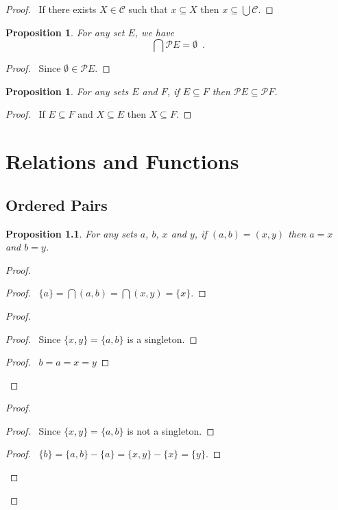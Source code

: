 \documentclass{report}
\let\qed\relax
\newtheorem{prop}[ax]{Proposition}
\theoremstyle{definition}
\begin{document}
\begin{proof}
\pf\ If there exists $X \in \mathcal{C}$ such that $x \subseteq X$ then $x \subseteq \bigcup \mathcal{C}$. \qed
\end{proof}

\begin{prop}
For any set $E$, we have
\[ \bigcap \mathcal{P} E = \emptyset \enspace . \]
\end{prop}

\begin{proof}
\pf\ Since $\emptyset \in \mathcal{P} E$. \qed
\end{proof}

\begin{prop}
For any sets $E$ and $F$, if $E \subseteq F$ then $\mathcal{P} E \subseteq \mathcal{P} F$.
\end{prop}

\begin{proof}
\pf\ If $E \subseteq F$ and $X \subseteq E$ then $X \subseteq F$. \qed
\end{proof}

\chapter{Relations and Functions}

\section{Ordered Pairs}

\begin{prop}
For any sets $a$, $b$, $x$ and $y$, if $(a,b) = (x,y)$ then $a = x$ and $b = y$.
\end{prop}

\begin{proof}
\pf
{}
\begin{proof}
	\pf\ $\{a\} = \bigcap (a,b) = \bigcap (x,y) = \{x\}$.
\end{proof}
\begin{proof}
	\begin{proof}
		\pf\ Since $\{x,y\} = \{a,b\}$ is a singleton.
	\end{proof}
	\begin{proof}
		\pf\ $b = a = x = y$
	\end{proof}
\end{proof}
\begin{proof}
	\begin{proof}
		\pf\ Since $\{x,y\} = \{a,b\}$ is not a singleton.
	\end{proof}
	\begin{proof}
		\pf\ $\{b\} = \{a,b\} - \{a\} = \{x,y\} - \{x\} = \{y\}$.
	\end{proof}
\end{proof}
\qed
\end{proof}
\end{document}
